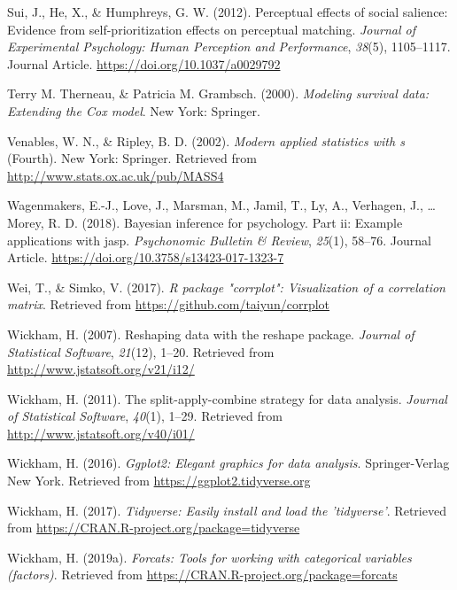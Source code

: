 \documentclass[man]{apa6}
\begin{document}
\leavevmode\hypertarget{ref-Sui_2012_JEPHPP}{}%
Sui, J., He, X., \& Humphreys, G. W. (2012). Perceptual effects of social salience: Evidence from self-prioritization effects on perceptual matching. \emph{Journal of Experimental Psychology: Human Perception and Performance}, \emph{38}(5), 1105--1117. Journal Article. \url{https://doi.org/10.1037/a0029792}

\leavevmode\hypertarget{ref-R-survival-book}{}%
Terry M. Therneau, \& Patricia M. Grambsch. (2000). \emph{Modeling survival data: Extending the Cox model}. New York: Springer.

\leavevmode\hypertarget{ref-R-MASS}{}%
Venables, W. N., \& Ripley, B. D. (2002). \emph{Modern applied statistics with s} (Fourth). New York: Springer. Retrieved from \url{http://www.stats.ox.ac.uk/pub/MASS4}

\leavevmode\hypertarget{ref-Wagenmakers_2018_JASP}{}%
Wagenmakers, E.-J., Love, J., Marsman, M., Jamil, T., Ly, A., Verhagen, J., \ldots{} Morey, R. D. (2018). Bayesian inference for psychology. Part ii: Example applications with jasp. \emph{Psychonomic Bulletin \& Review}, \emph{25}(1), 58--76. Journal Article. \url{https://doi.org/10.3758/s13423-017-1323-7}

\leavevmode\hypertarget{ref-R-corrplot2017}{}%
Wei, T., \& Simko, V. (2017). \emph{R package "corrplot": Visualization of a correlation matrix}. Retrieved from \url{https://github.com/taiyun/corrplot}

\leavevmode\hypertarget{ref-R-reshape2}{}%
Wickham, H. (2007). Reshaping data with the reshape package. \emph{Journal of Statistical Software}, \emph{21}(12), 1--20. Retrieved from \url{http://www.jstatsoft.org/v21/i12/}

\leavevmode\hypertarget{ref-R-plyr}{}%
Wickham, H. (2011). The split-apply-combine strategy for data analysis. \emph{Journal of Statistical Software}, \emph{40}(1), 1--29. Retrieved from \url{http://www.jstatsoft.org/v40/i01/}

\leavevmode\hypertarget{ref-R-ggplot2}{}%
Wickham, H. (2016). \emph{Ggplot2: Elegant graphics for data analysis}. Springer-Verlag New York. Retrieved from \url{https://ggplot2.tidyverse.org}

\leavevmode\hypertarget{ref-R-tidyverse}{}%
Wickham, H. (2017). \emph{Tidyverse: Easily install and load the 'tidyverse'}. Retrieved from \url{https://CRAN.R-project.org/package=tidyverse}

\leavevmode\hypertarget{ref-R-forcats}{}%
Wickham, H. (2019a). \emph{Forcats: Tools for working with categorical variables (factors)}. Retrieved from \url{https://CRAN.R-project.org/package=forcats}
\end{document}
